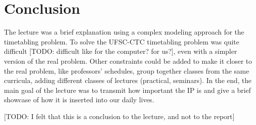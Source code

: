\section{Conclusion}

The lecture was a brief explanation using a complex modeling approach for the timetabling problem. To solve the UFSC-CTC timetabling problem was quite difficult [TODO: difficult like for the computer? for us?], even with a simpler version of the real problem. Other constraints could be added to make it closer to the real problem, like professors' schedules, group together classes from the same curricula, adding different classes of lectures (practical, seminars). In the end, the main goal of the lecture was to transmit how important the IP is and give a brief showcase of how it is inserted into our daily lives.

[TODO: I felt that this is a conclusion to the lecture, and not to the report]

